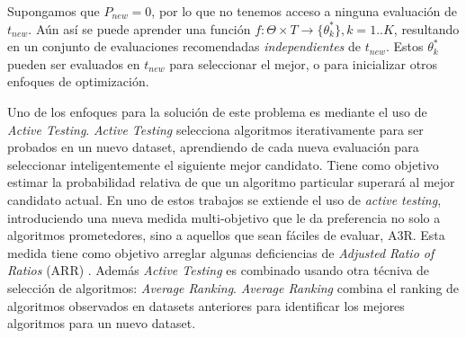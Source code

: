 
Supongamos que $P_{new} = 0$, por lo que no tenemos acceso a ninguna evaluación de $t_{new}$. Aún así se puede aprender una función $f: \Theta \times T \rightarrow \{\theta^*_k\}, k=1..K$, resultando en un conjunto de evaluaciones recomendadas \textit{independientes} de $t_{new}$. Estos $\theta^*_k$ pueden ser evaluados en $t_{new}$ para seleccionar el mejor, o para inicializar otros enfoques de optimización.

Uno de los enfoques para la solución de este problema es mediante el uso de \textit{Active Testing}\cite{leite2017selecting}. \textit{Active Testing} selecciona algoritmos iterativamente para ser probados en un nuevo dataset, aprendiendo de cada nueva evaluación para seleccionar inteligentemente el siguiente mejor candidato. Tiene como objetivo estimar la probabilidad relativa de que un algoritmo particular superará al mejor candidato actual. En uno de estos trabajos \cite{abdulrahman2018speeding} se extiende el uso de \textit{active testing}, introduciendo una nueva medida multi-objetivo que le da preferencia no solo a algoritmos prometedores, sino a aquellos que sean fáciles de evaluar, A3R. Esta medida tiene como objetivo arreglar algunas deficiencias de \textit{Adjusted Ratio of Ratios} (ARR) \cite{abdulrahman2014measures}. Además \textit{Active Testing} es combinado usando otra técniva de selección de algoritmos: \textit{Average Ranking}. \textit{Average Ranking} combina el ranking de algoritmos observados en datasets anteriores para identificar los mejores algoritmos para un nuevo dataset.

